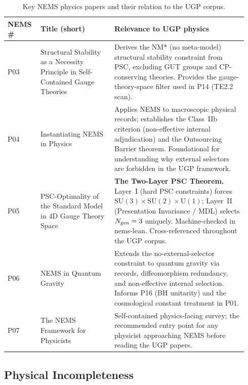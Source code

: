 \documentclass[11pt]{article}
\begin{document}
\begin{table}[H]
\centering
\footnotesize
\renewcommand{\arraystretch}{1.25}
\caption{Key NEMS physics papers and their relation to the UGP corpus.}
\label{tab:nems_physics}
\begin{tabular}{@{}P{0.10\linewidth}P{0.30\linewidth}P{0.54\linewidth}@{}}
\toprule
\textbf{NEMS\,\#} & \textbf{Title (short)} & \textbf{Relevance to UGP physics} \\
\midrule
P03~\cite{SpivackNMstar}
  & Structural Stability as a Necessity Principle in Self-Contained Gauge Theories
  & Derives the NM* (no meta-model) structural stability constraint from PSC,
    excluding GUT groups and CP-conserving theories.  Provides the
    gauge-theory-space filter used in P14 (TE2.2 scan). \\
\midrule
P04~\cite{SpivackNEMSPhysics}
  & Instantiating NEMS in Physics
  & Applies NEMS to macroscopic physical records; establishes the Class~IIb
    criterion (non-effective internal adjudication) and the Outsourcing Barrier
    theorem.  Foundational for understanding why external selectors are
    forbidden in the UGP framework. \\
\midrule
P05~\cite{SpivackNEMS05}
  & PSC-Optimality of the Standard Model in 4D Gauge Theory Space
  & \textbf{The Two-Layer PSC Theorem.}      Layer~I (hard PSC constraints) forces
    $\mathrm{SU}(3){\times}\mathrm{SU}(2){\times}\mathrm{U}(1)$;
    Layer~II (Presentation Invariance / MDL) selects $N_{\rm gen}=3$ uniquely.
    Machine-checked in nems-lean.  Cross-referenced throughout the UGP corpus. \\
\midrule
P06~\cite{SpivackNEMSQG}
  & NEMS in Quantum Gravity
  & Extends the no-external-selector constraint to quantum gravity via records,
    diffeomorphism redundancy, and non-effective internal selection.  Informs
    P16 (BH unitarity) and the cosmological constant treatment in P01. \\
\midrule
P07~\cite{SpivackNEMS07}
  & The NEMS Framework for Physicists
  & Self-contained physics-facing survey; the recommended entry point for any
    physicist approaching NEMS before reading the UGP papers. \\
\bottomrule
\end{tabular}
\end{table}

\subsection{Physical Incompleteness}
\end{document}
